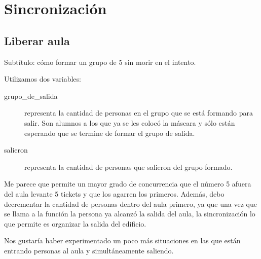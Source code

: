 \section{Sincronización}

\subsection{Liberar aula}
Subtítulo: cómo formar un grupo de 5 sin morir en el intento.

Utilizamos dos variables:
\begin{description}
  \item[grupo\_de\_salida] representa la cantidad de personas en el grupo que se está formando
  para salir. Son alumnos a los que ya se les colocó la máscara y sólo están esperando
  que se termine de formar el grupo de salida.
  \item[salieron] representa la cantidad de personas que salieron del grupo formado.
\end{description}



Me parece que permite un mayor grado de concurrencia que el número 5 afuera del aula
levante 5 tickets y que los agarren los primeros. Además, debo decrementar la cantidad de
personas dentro del aula primero, ya que una vez que se llama a la función la persona
ya alcanzó la salida del aula, la sincronización lo que permite es organizar la salida del
edificio.

Nos gustaría haber experimentado un poco más situaciones en las que están entrando personas
al aula y simultáneamente saliendo.
